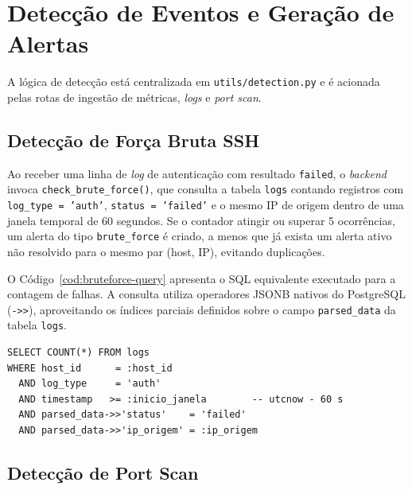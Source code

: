 \documentclass[
    12pt
    ,oneside
    ,a4paper
    ,chapter=TITLE
    ,section=TITLE
    ,sumario=abnt-6027-2012]{abntex2}
\begin{document}
\section{Detecção de Eventos e Geração de Alertas}
\label{sec:deteccao}

A lógica de detecção está centralizada em \texttt{utils/detection.py} e é acionada
pelas rotas de ingestão de métricas, \textit{logs} e \textit{port scan}.

\subsection{Detecção de Força Bruta SSH}
\label{subsec:bruteforce}

Ao receber uma linha de \textit{log} de autenticação com resultado \texttt{failed},
o \textit{backend} invoca \texttt{check\_brute\_force()}, que consulta a tabela
\texttt{logs} contando registros com \texttt{log\_type = 'auth'},
\texttt{status = 'failed'} e o mesmo IP de origem dentro de uma janela temporal de
60 segundos. Se o contador atingir ou superar 5 ocorrências, um alerta do tipo
\texttt{brute\_force} é criado, a menos que já exista um alerta ativo não resolvido
para o mesmo par (host, IP), evitando duplicações.

O Código~\ref{cod:bruteforce-query} apresenta o SQL equivalente executado para a
contagem de falhas. A consulta utiliza operadores JSONB nativos do PostgreSQL
(\texttt{->>}), aproveitando os índices parciais definidos sobre o campo
\texttt{parsed\_data} da tabela \texttt{logs}.

\begin{codigo}[H]
\begin{lstlisting}
SELECT COUNT(*) FROM logs
WHERE host_id      = :host_id
  AND log_type     = 'auth'
  AND timestamp   >= :inicio_janela        -- utcnow - 60 s
  AND parsed_data->>'status'    = 'failed'
  AND parsed_data->>'ip_origem' = :ip_origem
\end{lstlisting}
\end{codigo}

\subsection{Detecção de Port Scan}
\label{subsec:portscan-backend}
\end{document}
